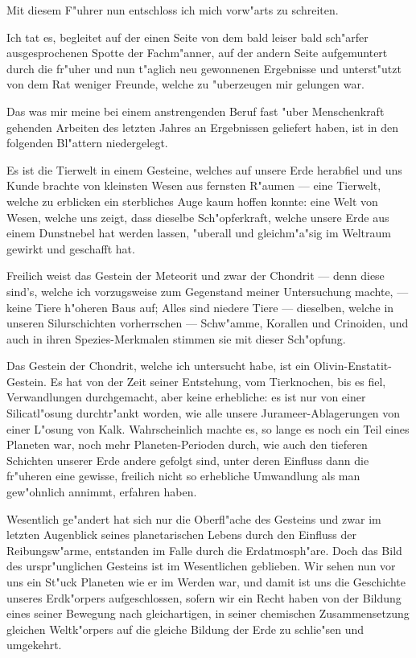\documentclass[a4paper, 11pt, oneside]{article}
\begin{document}
Mit diesem F"uhrer nun entschloss ich mich vorw"arts zu schreiten.

Ich tat es, begleitet auf der einen Seite von dem bald leiser bald sch"arfer ausgesprochenen Spotte der Fachm"anner, auf der andern Seite aufgemuntert durch die fr"uher und nun t"aglich neu gewonnenen Ergebnisse und unterst"utzt von dem Rat weniger Freunde, welche zu "uberzeugen mir gelungen war.

Das was mir meine bei einem anstrengenden Beruf fast "uber Menschenkraft gehenden Arbeiten des letzten Jahres an Ergebnissen geliefert haben, ist in den folgenden Bl"attern niedergelegt.

Es ist die Tierwelt in einem Gesteine, welches auf unsere Erde herabfiel und uns Kunde brachte von kleinsten Wesen aus fernsten R"aumen --- eine Tierwelt, welche zu erblicken ein sterbliches Auge kaum hoffen konnte: eine Welt von Wesen, welche uns zeigt, dass dieselbe Sch"opferkraft, welche unsere Erde aus einem Dunstnebel hat werden lassen, "uberall und gleichm"a"sig im Weltraum gewirkt und geschafft hat.

Freilich weist das Gestein der Meteorit und zwar der Chondrit --- denn diese sind's, welche ich vorzugsweise zum Gegenstand meiner Untersuchung machte, --- keine Tiere h"oheren Baus auf; Alles sind niedere Tiere --- dieselben, welche in unseren Silurschichten vorherrschen --- Schw"amme, Korallen und Crinoiden, und auch in ihren Spezies-Merkmalen stimmen sie mit dieser Sch"opfung.

Das Gestein der Chondrit, welche ich untersucht habe, ist ein Olivin-Enstatit-Gestein. Es hat von der Zeit seiner Entstehung, vom Tierknochen, bis es fiel, Verwandlungen durchgemacht, aber keine erhebliche: es ist nur von einer Silicatl"osung durchtr"ankt worden, wie alle unsere Jurameer-Ablagerungen von einer L"osung von Kalk. Wahrscheinlich machte es, so lange es noch ein Teil eines Planeten war, noch mehr Planeten-Perioden durch, wie auch den tieferen Schichten unserer Erde andere gefolgt sind, unter deren Einfluss dann die fr"uheren eine gewisse, freilich nicht so erhebliche Umwandlung als man gew"ohnlich annimmt, erfahren haben.

Wesentlich ge"andert hat sich nur die Oberfl"ache des Gesteins und zwar im letzten Augenblick seines planetarischen Lebens durch den Einfluss der Reibungsw"arme, entstanden im Falle durch die Erdatmosph"are. Doch das Bild des urspr"unglichen Gesteins ist im Wesentlichen geblieben. Wir sehen nun vor uns ein St"uck Planeten wie er im Werden war, und damit ist uns die Geschichte unseres Erdk"orpers aufgeschlossen, sofern wir ein Recht haben von der Bildung eines seiner Bewegung nach gleichartigen, in seiner chemischen Zusammensetzung gleichen Weltk"orpers auf die gleiche Bildung der Erde zu schlie"sen und umgekehrt.
\end{document}
